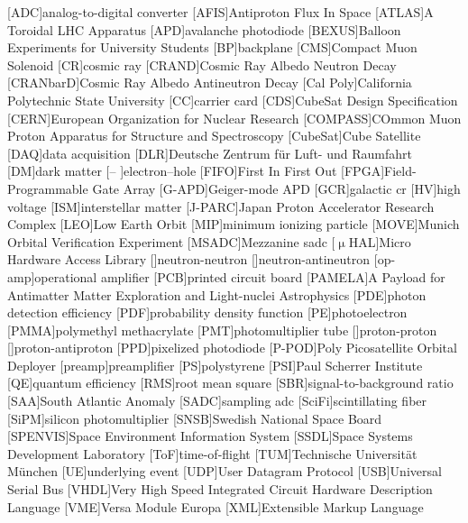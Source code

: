 [ADC]{analog-to-digital converter}
[AFIS]{Antiproton Flux In Space}
[ATLAS]{A Toroidal LHC Apparatus}
[APD]{avalanche photodiode}
[BEXUS]{Balloon Experiments for University Students}
[BP]{backplane}
[CMS]{Compact Muon Solenoid}
[CR]{cosmic ray}
[CRAND]{Cosmic Ray Albedo Neutron Decay}
[CRANbarD]{Cosmic Ray Albedo Antineutron Decay}
[Cal Poly]{California Polytechnic State University}
[CC]{carrier card}
[CDS]{CubeSat Design Specification}
[CERN]{European Organization for Nuclear Research}
[COMPASS]{COmmon Muon Proton Apparatus for Structure and Spectroscopy}
[CubeSat]{Cube Satellite}
[DAQ]{data acquisition}
[DLR]{Deutsche Zentrum f\"ur Luft- und Raumfahrt}
[DM]{dark matter}
[\Pem -- \Php]{electron--hole}
[FIFO]{First In First Out}
[FPGA]{Field-Programmable Gate Array}
[G-APD]{Geiger-mode APD}
[GCR]{galactic \ac{cr}}
[HV]{high voltage}
[ISM]{interstellar matter}
[J-PARC]{Japan Proton Accelerator Research Complex}
[LEO]{Low Earth Orbit}
[MIP]{minimum ionizing particle}
[MOVE]{Munich Orbital Verification Experiment}
[MSADC]{Mezzanine \acs{sadc}}
[$\upmu$HAL]{Micro Hardware Access Library}
[\Pn \Pn]{neutron-neutron}
[\Pn \Pnbar]{neutron-antineutron}
[op-amp]{operational amplifier}
[PCB]{printed circuit board}
[PAMELA]{A Payload for Antimatter Matter Exploration and Light-nuclei Astrophysics}
[PDE]{photon detection efficiency}
[PDF]{probability density function}
[PE]{photoelectron}
[PMMA]{polymethyl methacrylate}
[PMT]{photomultiplier tube}
[\Pp \Pp]{proton-proton}
[\Pp \Ppbar]{proton-antiproton}
[PPD]{pixelized photodiode}
[P-POD]{Poly Picosatellite Orbital Deployer}
[preamp]{preamplifier}
[PS]{polystyrene}
[PSI]{Paul Scherrer Institute}
[QE]{quantum efficiency}
[RMS]{root mean square}
[SBR]{signal-to-background ratio}
[SAA]{South Atlantic Anomaly}
[SADC]{sampling \acs{adc}}
[SciFi]{scintillating fiber}
[SiPM]{silicon photomultiplier}
[SNSB]{Swedish National Space Board}
[SPENVIS]{Space Environment Information System}
[SSDL]{Space Systems Development Laboratory}
[ToF]{time-of-flight}
[TUM]{Technische Universit\"at M\"unchen}
[UE]{underlying event}
[UDP]{User Datagram Protocol}
[USB]{Universal Serial Bus}
[VHDL]{Very High Speed Integrated Circuit Hardware Description Language}
[VME]{Versa Module Europa}
[XML]{Extensible Markup Language}